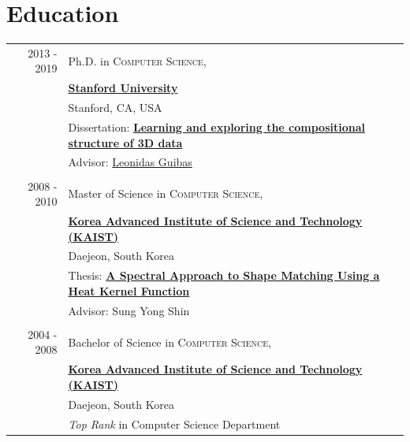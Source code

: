 \documentclass[letterpaper,10pt]{article} %
\begin{document}

\section{Education}

\begin{tabular}{r|p{14cm}}
2013 - 2019 & Ph.D. in \textsc{Computer Science},\\
& \href{https://www.stanford.edu}{\textbf{Stanford University}} \\
& Stanford, CA, USA\\
& Dissertation: \href{https://searchworks.stanford.edu/view/13333384}{\textbf{Learning and exploring the compositional structure of 3D data}}\\
& Advisor: \href{https://geometry.stanford.edu/member/guibas/}{Leonidas Guibas}\\
&\\


2008 - 2010 & Master of Science in \textsc{Computer Science},\\
& \href{https://www.kaist.ac.kr/en/}{\textbf{Korea Advanced Institute of Science and Technology (KAIST)}} \\
& Daejeon, South Korea\\
& Thesis: \href{http://koasas.kaist.ac.kr/handle/10203/34894}{\textbf{A Spectral Approach to Shape Matching Using a Heat Kernel Function}}\\
& Advisor: Sung Yong Shin\\
&\\


2004 - 2008 & Bachelor of Science in \textsc{Computer Science},\\
& \href{https://www.kaist.ac.kr/en/}{\textbf{Korea Advanced Institute of Science and Technology (KAIST)}} \\
& Daejeon, South Korea\\
& \emph{Top Rank} in Computer Science Department\\


\end{tabular}\\
\end{document}
